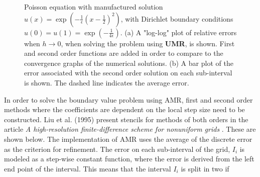\begin{figure}
\centering
{}\hspace{0mm}
\hspace{0mm}

\caption{Poisson equation with manufactured solution $u(x) = \exp{\left(-\frac{1}{\epsilon}(x-\frac{1}{2})^2\right)}$, with Dirichlet boundary conditions $u(0) = u(1) = \exp{\left(-\frac{1}{4\epsilon}\right)}$. (a) A "log-log" plot of relative errors when $h \rightarrow 0$, when solving the problem using \textbf{UMR}, is shown. First and second order functions are added in order to compare to the convergence graphs of the numerical solutions. (b) A bar plot of the error associated with the second order solution on each sub-interval is shown. The dashed line indicates the average error. }
\end{figure}


In order to solve the boundary value problem using AMR, first and second order methods where the coefficients are dependent on the local step size need to be constructed. Liu et al. (1995) present stencils for methods of both orders in the article \textit{A high-resolution finite-difference scheme for nonuniform grids} \cite{Liu}. These are shown below. The implementation of AMR uses the average of the discrete error as the criterion for refinement. The error on each sub-interval of the grid, $I_i$ is modeled as a step-wise constant function, where the error is derived from the left end point of the interval. This means that the interval $I_i$ is split in two if

